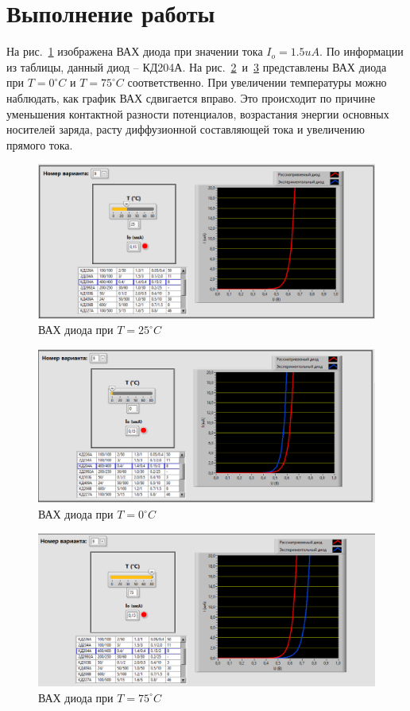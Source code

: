 \documentclass[a4paper,14pt]{article}
\begin{document}
\section{Выполнение работы}

На рис.~\ref{fig:temp_25} изображена ВАХ диода при значении тока $I_o = 1.5 uA$.
По информации из таблицы, данный диод -- КД204А.
На рис.~\ref{fig:temp_0}~и~\ref{fig:temp_75} представлены ВАХ диода при $T=0^{\circ} C$ и $T=75^{\circ} C$ соответственно.
При увеличении температуры можно наблюдать, как график ВАХ сдвигается вправо.
Это происходит по причине уменьшения контактной разности потенциалов, возрастания энергии основных носителей заряда, расту диффузионной составляющей тока и увеличению прямого тока. 
	
\begin{figure}[H]
	\centering
	\includegraphics[width=\linewidth]{image/temp_25}
	\caption{ВАХ диода при $T=25^{\circ} C$}
	\label{fig:temp_25}
\end{figure}


\begin{figure}[H]
	\centering
	\includegraphics[width=\linewidth]{image/temp_0}
	\caption{ВАХ диода при $T=0^\circ C$}
	\label{fig:temp_0}
\end{figure}

\begin{figure}[H]
	\centering
	\includegraphics[width=\linewidth]{image/temp_75}
	\caption{ВАХ диода при $T=75^\circ C$}
	\label{fig:temp_75}
\end{figure}
\end{document}
